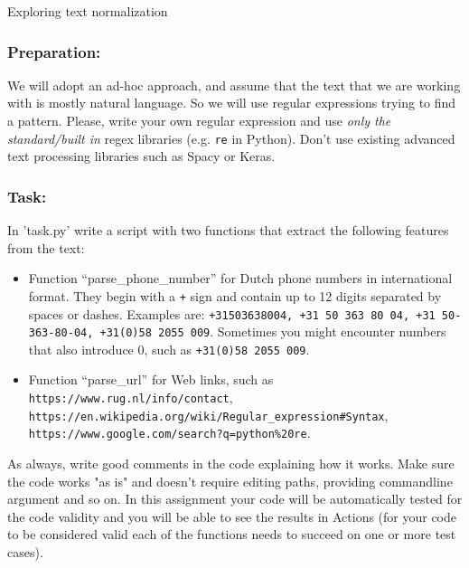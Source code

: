 \documentclass{../labbook}
\begin{document}
\begin{problem}{1}{7}{Exploring text normalization}

\subsubsection*{Preparation:}
We will adopt an ad-hoc approach, and assume that the text that we are working with is mostly natural language. So we will use regular expressions trying to find a pattern. 
Please, write your own regular expression and use \textit{only the standard/built in} regex libraries (e.g. \texttt{re} in Python). Don't use existing advanced text processing libraries such as Spacy or Keras. 

\subsubsection*{Task:}
In 'task.py' write a script with two functions that extract the following features from the text:
\begin{itemize}
    \item Function ``parse\_phone\_number'' for Dutch phone numbers in international format. They begin with a \texttt{+} sign and contain up to 12 digits separated by spaces or dashes. 
Examples are: \texttt{+31503638004, +31 50 363 80 04, +31 50-363-80-04, +31(0)58 2055 009}. Sometimes you might encounter numbers that also introduce $0$, such as \texttt{+31(0)58 2055 009}.
    \item Function ``parse\_url'' for Web links, such as \texttt{https://www.rug.nl/info/contact}, \\
        \texttt{https://en.wikipedia.org/wiki/Regular\_expression\#Syntax}, \\
        \texttt{https://www.google.com/search?q=python\%20re}.
    \end{itemize}

As always, write good comments in the code explaining how it works.
Make sure the code works "as is" and doesn't require editing paths, providing commandline argument and so on. In this assignment your code will be automatically tested for the code validity and you will be able to see the results in Actions (for your code to be considered valid each of the functions needs to succeed on one or more test cases).


\end{problem}
\end{document}
